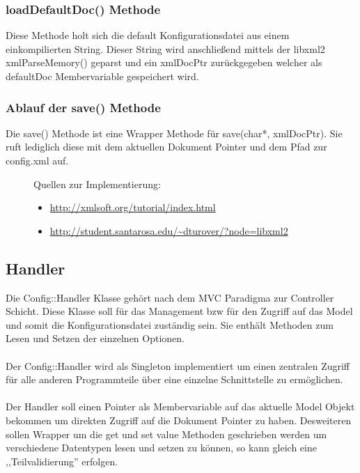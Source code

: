 \subsubsection{loadDefaultDoc() Methode}
Diese Methode holt sich die default Konfigurationsdatei aus einem einkompilierten String.
Dieser String wird anschließend mittels der libxml2 xmlParseMemory() geparst und ein xmlDocPtr zurückgegeben welcher als defaultDoc Membervariable gespeichert wird.

\subsubsection{Ablauf der save() Methode}
Die save() Methode ist eine Wrapper Methode für save(char*, xmlDocPtr). Sie ruft lediglich diese mit dem aktuellen Dokument Pointer und dem Pfad zur config.xml auf.

\begin{figure}[htb!]
    Quellen zur Implementierung:
    \begin{itemize}
        \item \url{http://xmlsoft.org/tutorial/index.html}
        \item \url{http://student.santarosa.edu/~dturover/?node=libxml2}
    \end{itemize}
\end{figure}



\subsection{Handler}
Die Config::Handler Klasse gehört nach dem MVC Paradigma zur Controller Schicht. Diese Klasse soll für das Management bzw für den
Zugriff auf das Model und somit die Konfigurationsdatei zuständig sein. Sie enthält Methoden zum Lesen und Setzen der einzelnen Optionen.
\\
\\
Der Config::Handler wird als Singleton implementiert um einen zentralen Zugriff für alle anderen Programmteile über eine einzelne Schnittstelle zu ermöglichen.
\\
\\
Der Handler soll einen Pointer als Membervariable auf das aktuelle Model Objekt bekommen um direkten Zugriff auf die Dokument Pointer
zu haben. Desweiteren sollen Wrapper um die get und set value Methoden geschrieben werden um verschiedene Datentypen lesen und setzen zu können, so kann gleich eine ,,Teilvalidierung'' erfolgen.


